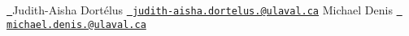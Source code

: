 \href{https://classroom.github.com/a/df8KbmFN}{\texttt{ }} Judith-\/\+Aisha Dortélus \href{mailto:judith-aisha.dortelus.1@ulaval.ca}{\texttt{ judith-\/aisha.\+dortelus.@ulaval.\+ca}} Michael Denis \href{mailto:michael.denis.1@ulaval.ca}{\texttt{ michael.\+denis.@ulaval.\+ca}} 